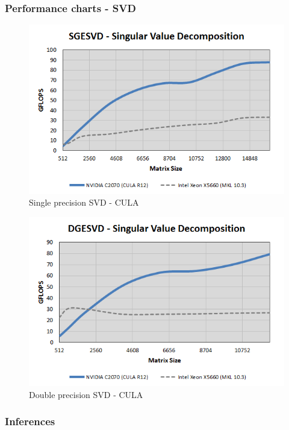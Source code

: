 \documentclass[submit]{aiaa-tc_mod}%
\begin{document}
\subsubsection{Performance charts - SVD}


\begin{figure}[H]
 \includegraphics[width=\textwidth]{SGESVD.png}
 \caption{Single precision SVD - CULA}
 \label{sgesvd}
\end{figure}

\begin{figure}[H]
 \includegraphics[width=\textwidth]{DGESVD.png}
 \caption{Double precision SVD - CULA}
 \label{dgesvd}
\end{figure}

\subsubsection{Inferences}
\end{document}
